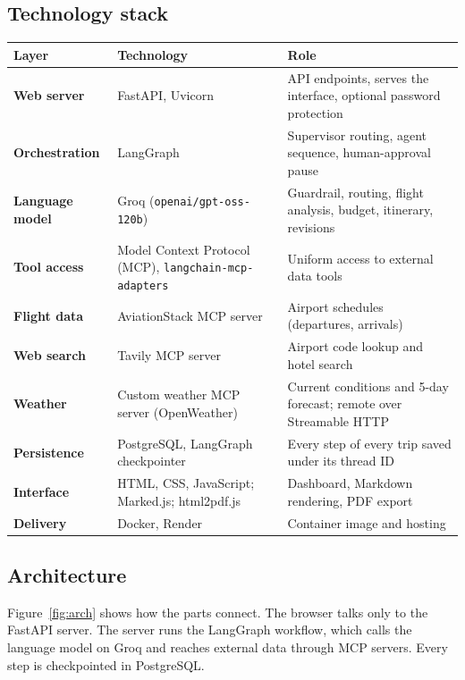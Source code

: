 \documentclass[11pt,a4paper]{article}
\newcommand{\code}[1]{\texttt{\color{slate}#1}}
\begin{document}
\subsection{Technology stack}
\begin{tabularx}{\linewidth}{@{}>{\leavevmode\color{slate}\bfseries}p{34mm}>{\raggedright\arraybackslash}p{44mm}L@{}}
\toprule
Layer & Technology & Role \\
\midrule
Web server & FastAPI, Uvicorn & API endpoints, serves the interface, optional password protection \\
Orchestration & LangGraph & Supervisor routing, agent sequence, human-approval pause \\
Language model & Groq (\code{openai/gpt-oss-120b}) & Guardrail, routing, flight analysis, budget, itinerary, revisions \\
Tool access & Model Context Protocol (MCP), \code{langchain-mcp-adapters} & Uniform access to external data tools \\
Flight data & AviationStack MCP server & Airport schedules (departures, arrivals) \\
Web search & Tavily MCP server & Airport code lookup and hotel search \\
Weather & Custom weather MCP server (OpenWeather) & Current conditions and 5-day forecast; remote over Streamable HTTP \\
Persistence & PostgreSQL, LangGraph checkpointer & Every step of every trip saved under its thread ID \\
Interface & HTML, CSS, JavaScript; Marked.js; html2pdf.js & Dashboard, Markdown rendering, PDF export \\
Delivery & Docker, Render & Container image and hosting \\
\bottomrule
\end{tabularx}

\subsection{Architecture}
Figure~\ref{fig:arch} shows how the parts connect. The browser talks only to the FastAPI server. The server runs the LangGraph workflow, which calls the language model on Groq and reaches external data through MCP servers. Every step is checkpointed in PostgreSQL.
\end{document}
